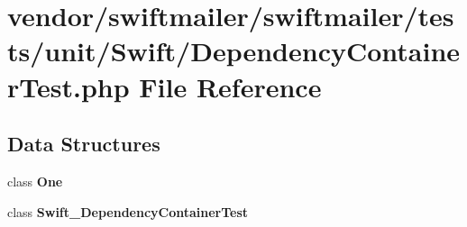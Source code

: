 \section{vendor/swiftmailer/swiftmailer/tests/unit/\+Swift/\+Dependency\+Container\+Test.php File Reference}
\label{_dependency_container_test_8php}
\subsection*{Data Structures}
\begin{DoxyCompactItemize}
\item 
class {\bf One}
\item 
class {\bf Swift\+\_\+\+Dependency\+Container\+Test}
\end{DoxyCompactItemize}
